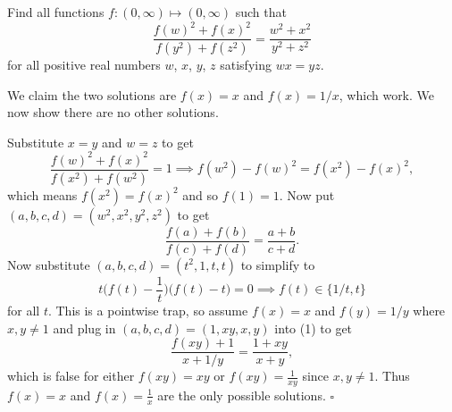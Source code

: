 
\begin{problem}[ISL 2008 A1]
    Find all functions $f : (0, \infty) \mapsto (0, \infty)$ such that
    \[ \frac{f(w)^2 + f(x)^2}{f(y^2) + f(z^2)} = \frac{w^2 + x^2}{y^2 + z^2} \]
    for all positive real numbers $w$, $x$, $y$, $z$ satisfying $wx = yz$.
\end{problem}

\begin{solution}[Ritwin]
    We claim the two solutions are $f(x) = x$ and $f(x) = 1/x$, which work.
    We now show there are no other solutions.
    
    Substitute $x = y$ and $w = z$ to get
    \[\frac{f(w)^2 + f(x)^2}{f(x^2) + f(w^2)} = 1 \implies f(w^2) - f(w)^2 = f(x^2) - f(x)^2,\]
    which means $f(x^2) = f(x)^2$ and so $f(1) = 1$. Now put $(a,b,c,d) = (w^2, x^2, y^2, z^2)$
    to get \[\frac{f(a)+f(b)}{f(c)+f(d)} = \frac{a+b}{c+d}. \tag{1}\]
    Now substitute $(a,b,c,d) = (t^2, 1, t, t)$ to simplify to
    \[t\bigg(f(t) - \frac1t\bigg)\bigg(f(t) - t\bigg) = 0 \implies f(t) \in \{1/t, t\}\]
    for all $t$. This is a pointwise trap, so assume $f(x) = x$ and $f(y) = 1/y$
    where $x,y \neq 1$ and plug in $(a,b,c,d) = (1, xy, x, y)$ into (1) to get
    \[\frac{f(xy) + 1}{x + 1/y} = \frac{1 + xy}{x + y},\]
    which is false for either $f(xy) = xy$ or $f(xy) = \tfrac{1}{xy}$ since $x,y \neq 1$.
    Thus $f(x) = x$ and $f(x) = \frac1x$ are the only possible solutions. $\square$
\end{solution}
